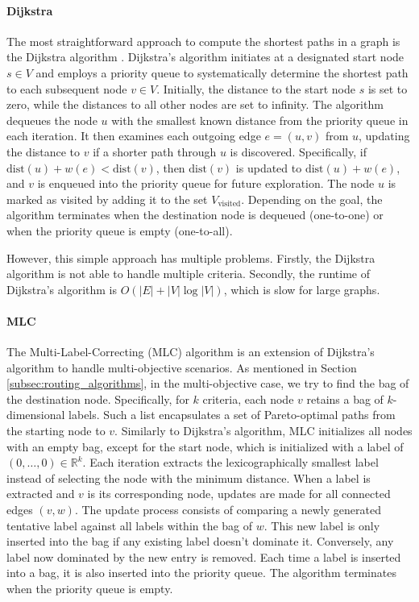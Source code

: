 \paragraph{Dijkstra}
\label{subsubsec:dijkstra}
The most straightforward approach to compute the shortest paths in a graph is the Dijkstra algorithm .
Dijkstra's algorithm initiates at a designated start node \( s \in V \) and employs a priority queue to systematically determine the shortest path to each subsequent node \( v \in V \).
Initially, the distance to the start node \( s \) is set to zero, while the distances to all other nodes are set to infinity.
The algorithm dequeues the node \( u \) with the smallest known distance from the priority queue in each iteration.
It then examines each outgoing edge \( e = (u, v) \) from \( u \), updating the distance to \( v \) if a shorter path through \( u \) is discovered.
Specifically, if \( \text{dist}(u) + w(e) < \text{dist}(v) \), then \( \text{dist}(v) \) is updated to \( \text{dist}(u) + w(e) \), and \( v \) is enqueued into the priority queue for future exploration.
The node \( u \) is marked as visited by adding it to the set \( V_{\text{visited}} \).
Depending on the goal, the algorithm terminates when the destination node is dequeued (one-to-one) or when the priority queue is empty (one-to-all).


However, this simple approach has multiple problems.
Firstly, the Dijkstra algorithm is not able to handle multiple criteria.
Secondly, the runtime of Dijkstra's algorithm is \( O(|E| + |V| \log |V|) \), which is slow for large graphs.

\paragraph{MLC}
\label{subsubsec:mlc}

The Multi-Label-Correcting (MLC)  algorithm is an extension of Dijkstra's algorithm to handle multi-objective scenarios.
As mentioned in Section \ref{subsec:routing_algorithms}, in the multi-objective case, we try to find the bag of the destination node.
Specifically, for \(k\) criteria, each node \(v\) retains a bag of \(k\)-dimensional labels. Such a list encapsulates a set of Pareto-optimal paths from the starting node to \(v\).
Similarly to Dijkstra's algorithm, MLC initializes all nodes with an empty bag, except for the start node, which is initialized with a label of \( (0, \dots, 0) \in \mathbb{R}^k \).
Each iteration extracts the lexicographically smallest label instead of selecting the node with the minimum distance.
When a label is extracted and \(v\) is its corresponding node, updates are made for all connected edges \( (v, w) \).
The update process consists of comparing a newly generated tentative label against all labels within the bag of \(w\).
This new label is only inserted into the bag if any existing label doesn't dominate it.
Conversely, any label now dominated by the new entry is removed.
Each time a label is inserted into a bag, it is also inserted into the priority queue.
The algorithm terminates when the priority queue is empty.


